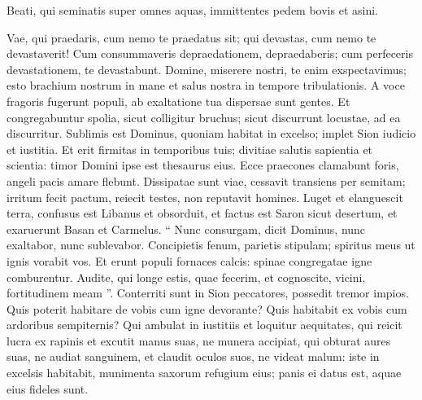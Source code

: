 \begin{biblechapter}
\begin{biblechapter}
\begin{biblechapter}
\begin{biblechapter}
\begin{biblechapter}
\begin{biblechapter}
\begin{biblechapter}
\begin{biblechapter}
\begin{biblechapter}
\begin{biblechapter}
\begin{biblechapter}
\begin{biblechapter}
\begin{biblechapter}
\begin{biblechapter}
\begin{biblechapter}
\begin{biblechapter}
\begin{biblechapter}
\begin{biblechapter}
\begin{biblechapter}
\begin{biblechapter}
\begin{biblechapter}
\begin{biblechapter}
\begin{biblechapter}
\begin{biblechapter}
\begin{biblechapter}
\begin{biblechapter}
\begin{biblechapter}
\begin{biblechapter}
\begin{biblechapter}
\begin{biblechapter}
\begin{biblechapter}
\begin{biblechapter}
 \verse Beati, qui seminatis super omnes aquas,
 immittentes pedem bovis et asini.
 
\begin{biblechapter}
\verse Vae, qui praedaris, cum nemo te praedatus sit;
 qui devastas, cum nemo te devastaverit!
 Cum consummaveris depraedationem, depraedaberis;
 cum perfeceris devastationem, te devastabunt.
 \verse Domine, miserere nostri,
 te enim exspectavimus;
 esto brachium nostrum in mane
 et salus nostra in tempore tribulationis.
 \verse A voce fragoris fugerunt populi,
 ab exaltatione tua dispersae sunt gentes.
 \verse Et congregabuntur spolia, sicut colligitur bruchus;
 sicut discurrunt locustae, ad ea discurritur.
 \verse Sublimis est Dominus, quoniam habitat in excelso;
 implet Sion iudicio et iustitia.
 \verse Et erit firmitas in temporibus tuis;
 divitiae salutis sapientia et scientia:
 timor Domini ipse est thesaurus eius.
 \verse Ecce praecones clamabunt foris,
 angeli pacis amare flebunt.
 \verse Dissipatae sunt viae, cessavit transiens per semitam;
 irritum fecit pactum,
 reiecit testes,
 non reputavit homines.
 \verse Luget et elanguescit terra,
 confusus est Libanus et obsorduit,
 et factus est Saron sicut desertum,
 et exaruerunt Basan et Carmelus.
 \verse “ Nunc consurgam, dicit Dominus,
 nunc exaltabor, nunc sublevabor.
 \verse Concipietis fenum, parietis stipulam;
 spiritus meus ut ignis vorabit vos.
 \verse Et erunt populi fornaces calcis:
 spinae congregatae igne comburentur.
 \verse Audite, qui longe estis, quae fecerim,
 et cognoscite, vicini, fortitudinem meam ”.
 \verse Conterriti sunt in Sion peccatores,
 possedit tremor impios.
 Quis poterit habitare de vobis cum igne devorante?
 Quis habitabit ex vobis cum ardoribus sempiternis?
 \verse Qui ambulat in iustitiis et loquitur aequitates,
 qui reicit lucra ex rapinis
 et excutit manus suas, ne munera accipiat,
 qui obturat aures suas, ne audiat sanguinem,
 et claudit oculos suos, ne videat malum:
 \verse iste in excelsis habitabit,
 munimenta saxorum refugium eius;
 panis ei datus est, aquae eius fideles sunt.

\end{biblechapter}
\end{biblechapter}
\end{biblechapter}
\end{biblechapter}
\end{biblechapter}
\end{biblechapter}
\end{biblechapter}
\end{biblechapter}
\end{biblechapter}
\end{biblechapter}
\end{biblechapter}
\end{biblechapter}
\end{biblechapter}
\end{biblechapter}
\end{biblechapter}
\end{biblechapter}
\end{biblechapter}
\end{biblechapter}
\end{biblechapter}
\end{biblechapter}
\end{biblechapter}
\end{biblechapter}
\end{biblechapter}
\end{biblechapter}
\end{biblechapter}
\end{biblechapter}
\end{biblechapter}
\end{biblechapter}
\end{biblechapter}
\end{biblechapter}
\end{biblechapter}
\end{biblechapter}
\end{biblechapter}

